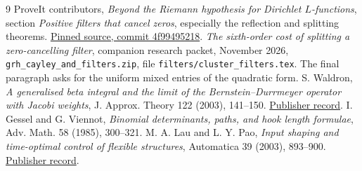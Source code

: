 \documentclass[11pt]{article}
\begin{document}
\begin{thebibliography}{9}
 ProveIt contributors, \emph{Beyond the Riemann hypothesis for
Dirichlet $L$-functions}, section \emph{Positive filters that cancel zeros},
especially the reflection and splitting theorems.
\href{https://github.com/VladimirReshetnikov/ProveIt/blob/4f99495218d1a19087deabd8fb5bbb8f5df72a46/Analysis/GeneralizedRiemannHypothesis/Article/sections/fil.tex}{Pinned source, commit 4f99495218}.
 \emph{The sixth-order cost of splitting a zero-cancelling
filter}, companion research packet, November 2026,
\texttt{grh\_cayley\_and\_filters.zip}, file
\texttt{filters/cluster\_filters.tex}. The final paragraph asks for the
uniform mixed entries of the quadratic form.
 S. Waldron, \emph{A generalised beta integral and the limit
of the Bernstein--Durrmeyer operator with Jacobi weights}, J. Approx.
Theory 122 (2003), 141--150.
\href{https://doi.org/10.1016/S0021-9045(03)00041-8}{Publisher record}.
 I. Gessel and G. Viennot, \emph{Binomial determinants, paths,
and hook length formulae}, Adv. Math. 58 (1985), 300--321.
 M. A. Lau and L. Y. Pao, \emph{Input shaping and time-optimal
control of flexible structures}, Automatica 39 (2003), 893--900.
\href{https://doi.org/10.1016/S0005-1098(03)00024-4}{Publisher record}.
\end{thebibliography}
\end{document}
